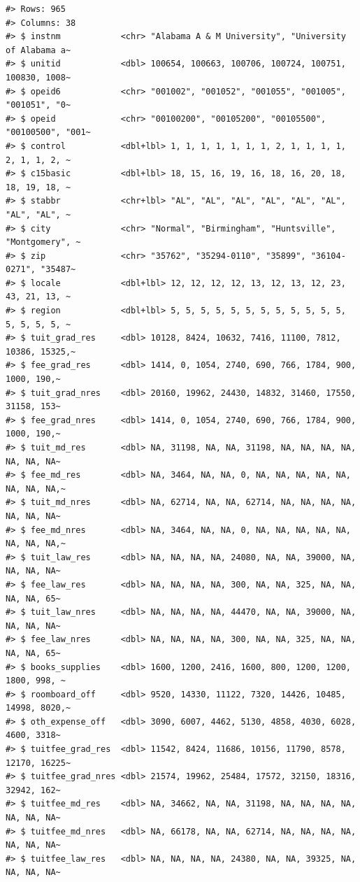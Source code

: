 \documentclass[
  letterpaper,
  DIV=11,
  numbers=noendperiod]{scrartcl}
\begin{document}
\begin{verbatim}
#> Rows: 965
#> Columns: 38
#> $ instnm            <chr> "Alabama A & M University", "University of Alabama a~
#> $ unitid            <dbl> 100654, 100663, 100706, 100724, 100751, 100830, 1008~
#> $ opeid6            <chr> "001002", "001052", "001055", "001005", "001051", "0~
#> $ opeid             <chr> "00100200", "00105200", "00105500", "00100500", "001~
#> $ control           <dbl+lbl> 1, 1, 1, 1, 1, 1, 1, 2, 1, 1, 1, 1, 2, 1, 1, 2, ~
#> $ c15basic          <dbl+lbl> 18, 15, 16, 19, 16, 18, 16, 20, 18, 18, 19, 18, ~
#> $ stabbr            <chr+lbl> "AL", "AL", "AL", "AL", "AL", "AL", "AL", "AL", ~
#> $ city              <chr> "Normal", "Birmingham", "Huntsville", "Montgomery", ~
#> $ zip               <chr> "35762", "35294-0110", "35899", "36104-0271", "35487~
#> $ locale            <dbl+lbl> 12, 12, 12, 12, 13, 12, 13, 12, 23, 43, 21, 13, ~
#> $ region            <dbl+lbl> 5, 5, 5, 5, 5, 5, 5, 5, 5, 5, 5, 5, 5, 5, 5, 5, ~
#> $ tuit_grad_res     <dbl> 10128, 8424, 10632, 7416, 11100, 7812, 10386, 15325,~
#> $ fee_grad_res      <dbl> 1414, 0, 1054, 2740, 690, 766, 1784, 900, 1000, 190,~
#> $ tuit_grad_nres    <dbl> 20160, 19962, 24430, 14832, 31460, 17550, 31158, 153~
#> $ fee_grad_nres     <dbl> 1414, 0, 1054, 2740, 690, 766, 1784, 900, 1000, 190,~
#> $ tuit_md_res       <dbl> NA, 31198, NA, NA, 31198, NA, NA, NA, NA, NA, NA, NA~
#> $ fee_md_res        <dbl> NA, 3464, NA, NA, 0, NA, NA, NA, NA, NA, NA, NA, NA,~
#> $ tuit_md_nres      <dbl> NA, 62714, NA, NA, 62714, NA, NA, NA, NA, NA, NA, NA~
#> $ fee_md_nres       <dbl> NA, 3464, NA, NA, 0, NA, NA, NA, NA, NA, NA, NA, NA,~
#> $ tuit_law_res      <dbl> NA, NA, NA, NA, 24080, NA, NA, 39000, NA, NA, NA, NA~
#> $ fee_law_res       <dbl> NA, NA, NA, NA, 300, NA, NA, 325, NA, NA, NA, NA, 65~
#> $ tuit_law_nres     <dbl> NA, NA, NA, NA, 44470, NA, NA, 39000, NA, NA, NA, NA~
#> $ fee_law_nres      <dbl> NA, NA, NA, NA, 300, NA, NA, 325, NA, NA, NA, NA, 65~
#> $ books_supplies    <dbl> 1600, 1200, 2416, 1600, 800, 1200, 1200, 1800, 998, ~
#> $ roomboard_off     <dbl> 9520, 14330, 11122, 7320, 14426, 10485, 14998, 8020,~
#> $ oth_expense_off   <dbl> 3090, 6007, 4462, 5130, 4858, 4030, 6028, 4600, 3318~
#> $ tuitfee_grad_res  <dbl> 11542, 8424, 11686, 10156, 11790, 8578, 12170, 16225~
#> $ tuitfee_grad_nres <dbl> 21574, 19962, 25484, 17572, 32150, 18316, 32942, 162~
#> $ tuitfee_md_res    <dbl> NA, 34662, NA, NA, 31198, NA, NA, NA, NA, NA, NA, NA~
#> $ tuitfee_md_nres   <dbl> NA, 66178, NA, NA, 62714, NA, NA, NA, NA, NA, NA, NA~
#> $ tuitfee_law_res   <dbl> NA, NA, NA, NA, 24380, NA, NA, 39325, NA, NA, NA, NA~

\end{verbatim}
\end{document}
